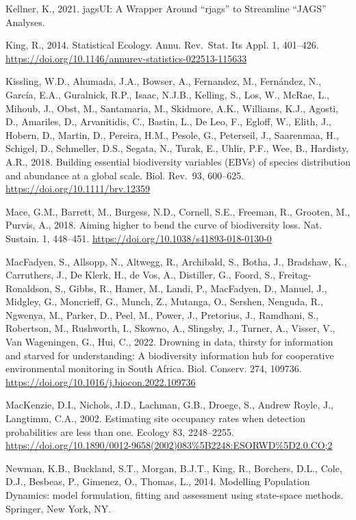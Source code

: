 \documentclass[utf8]{frontiersSCNS}
\begin{document}
Kellner, K., 2021. jagsUI: A Wrapper Around ``rjags'' to Streamline
``JAGS'' Analyses.

King, R., 2014. Statistical Ecology. Annu. Rev.~Stat. Its Appl. 1,
401--426. \url{https://doi.org/10.1146/annurev-statistics-022513-115633}

Kissling, W.D., Ahumada, J.A., Bowser, A., Fernandez, M., Fernández, N.,
García, E.A., Guralnick, R.P., Isaac, N.J.B., Kelling, S., Los, W.,
McRae, L., Mihoub, J., Obst, M., Santamaria, M., Skidmore, A.K.,
Williams, K.J., Agosti, D., Amariles, D., Arvanitidis, C., Bastin, L.,
De Leo, F., Egloff, W., Elith, J., Hobern, D., Martin, D., Pereira,
H.M., Pesole, G., Peterseil, J., Saarenmaa, H., Schigel, D., Schmeller,
D.S., Segata, N., Turak, E., Uhlir, P.F., Wee, B., Hardisty, A.R., 2018.
Building essential biodiversity variables (EBVs) of species distribution
and abundance at a global scale. Biol. Rev.~93, 600--625.
\url{https://doi.org/10.1111/brv.12359}

Mace, G.M., Barrett, M., Burgess, N.D., Cornell, S.E., Freeman, R.,
Grooten, M., Purvis, A., 2018. Aiming higher to bend the curve of
biodiversity loss. Nat. Sustain. 1, 448--451.
\url{https://doi.org/10.1038/s41893-018-0130-0}

MacFadyen, S., Allsopp, N., Altwegg, R., Archibald, S., Botha, J.,
Bradshaw, K., Carruthers, J., De Klerk, H., de Vos, A., Distiller, G.,
Foord, S., Freitag-Ronaldson, S., Gibbs, R., Hamer, M., Landi, P.,
MacFadyen, D., Manuel, J., Midgley, G., Moncrieff, G., Munch, Z.,
Mutanga, O., Sershen, Nenguda, R., Ngwenya, M., Parker, D., Peel, M.,
Power, J., Pretorius, J., Ramdhani, S., Robertson, M., Rushworth, I.,
Skowno, A., Slingsby, J., Turner, A., Visser, V., Van Wageningen, G.,
Hui, C., 2022. Drowning in data, thirsty for information and starved for
understanding: A biodiversity information hub for cooperative
environmental monitoring in South Africa. Biol. Conserv. 274, 109736.
\url{https://doi.org/10.1016/j.biocon.2022.109736}

MacKenzie, D.I., Nichols, J.D., Lachman, G.B., Droege, S., Andrew Royle,
J., Langtimm, C.A., 2002. Estimating site occupancy rates when detection
probabilities are less than one. Ecology 83, 2248--2255.
\url{https://doi.org/10.1890/0012-9658(2002)083\%5B2248:ESORWD\%5D2.0.CO;2}

Newman, K.B., Buckland, S.T., Morgan, B.J.T., King, R., Borchers, D.L.,
Cole, D.J., Besbeas, P., Gimenez, O., Thomas, L., 2014. Modelling
Population Dynamics: model formulation, fitting and assessment using
state-space methods. Springer, New York, NY.
\end{document}
